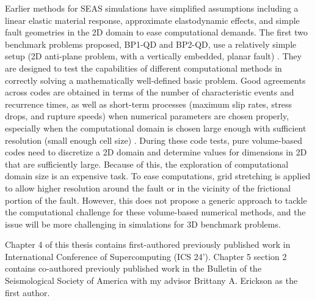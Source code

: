 Earlier methods for SEAS simulations have simplified assumptions including a linear elastic material response, approximate elastodynamic effects, and simple fault geometries in the 2D domain to ease computational demands.
The first two benchmark problems proposed, BP1-QD and BP2-QD, use a relatively simple setup (2D anti-plane problem, with a vertically embedded, planar fault) \citep{10.1785/0220190248}.
They are designed to test the capabilities of different computational methods in correctly solving a mathematically well-defined basic problem.
Good agreements across codes are obtained in terms of the number of characteristic events and recurrence times, as well as short-term processes (maximum slip rates, stress drops, and rupture speeds) when numerical parameters are chosen properly, especially when the computational domain is chosen large enough with sufficient resolution (small enough cell size) \citep{10.1785/0220190248}.
During these code tests, pure volume-based codes need to discretize a 2D domain and determine values for dimensions in 2D that are sufficiently large. Because of this, the exploration of computational domain size is an expensive task.
To ease computations, grid stretching is applied to allow higher resolution around the fault or in the vicinity of the frictional portion of the fault.
However, this does not propose a generic approach to tackle the computational challenge for these volume-based numerical methods, and the issue will be more challenging in simulations for 3D benchmark problems.

Chapter 4 of this thesis contains first-authored previously published work in International Conference of Supercomputing (ICS 24').
Chapter 5 section 2 contains co-authored previouly published work in the Bulletin of the Seismological Society of America with my advisor Brittany A. Erickson as the first author.